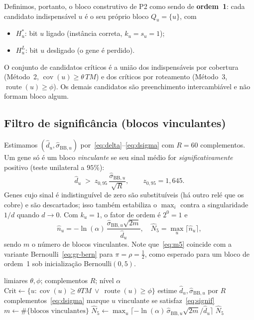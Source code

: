 \documentclass[conference]{IEEEtran}
\newcommand{\Nhat}{\hat{N}}
\newcommand{\cov}{\operatorname{cov}}
\newcommand{\route}{\operatorname{route}}
\begin{document}
Definimos, portanto, o bloco construtivo de P2 como sendo de \textbf{ordem~1}:
cada candidato indispensável $u$ é o seu próprio bloco $Q_u=\{u\}$, com
\begin{itemize}
\item $H_u^*$: bit $u$ ligado (instância correta, $k_u=s_u=1$);
\item $H_u^L$: bit $u$ desligado (o gene é perdido).
\end{itemize}
O conjunto de candidatos críticos é a união dos indispensáveis por cobertura
(Método~2, $\cov(u)\ge\theta\,TM$) e dos críticos por roteamento (Método~3,
$\route(u)\ge\phi$). Os demais candidatos são preenchimento intercambiável e não
formam bloco algum.

\subsection{Filtro de significância (blocos vinculantes)}
Estimamos $(\widehat{d}_u,\widehat{\sigma}_{\mathrm{BB},u})$ por~\eqref{eq:delta}--\eqref{eq:dsigma}
com $R=60$ complementos. Um gene só é um bloco \emph{vinculante} se seu sinal médio
for \emph{significativamente} positivo (teste unilateral a $95\%$):
\begin{equation}
\widehat{d}_u \;>\; z_{0{,}95}\,\frac{\widehat{\sigma}_{\mathrm{BB},u}}{\sqrt{R}},
\qquad z_{0{,}95}=1{,}645.
\label{eq:signif}
\end{equation}
Genes cujo sinal é indistinguível de zero são substituíveis (há outro relé que os
cobre) e são descartados; isso também estabiliza o $\max_i$ contra a singularidade
$1/d$ quando $d\to 0$. Com $k_u=1$, o fator de ordem é $2^{0}=1$ e
\begin{equation}
\boxed{\;\widehat{n}_u = -\ln(\alpha)\,\frac{\widehat{\sigma}_{\mathrm{BB},u}\sqrt{2m}}{\widehat{d}_u},
\quad \Nhat_5=\max_u\lceil \widehat{n}_u\rceil,\;}
\label{eq:m5}
\end{equation}
sendo $m$ o número de blocos vinculantes. Note que~\eqref{eq:m5} coincide com a
variante Bernoulli~\eqref{eq:gr-bern} para $\pi=\rho=\tfrac12$, como esperado para
um bloco de ordem~1 sob inicialização Bernoulli$(0{,}5)$.

\begin{algorithm}[!t]
\caption{Estimativa do Método 5}
\label{alg:m5}
\begin{algorithmic}[1]
\Require limiares $\theta,\phi$; complementos $R$; nível $\alpha$
\State $\mathrm{Crit}\gets\{u:\cov(u)\ge\theta TM \ \vee\ \route(u)\ge\phi\}$
  \State estime $\widehat d_u,\widehat{\sigma}_{\mathrm{BB},u}$ por $R$ complementos~\eqref{eq:dsigma}
  \State marque $u$ vinculante se satisfaz~\eqref{eq:signif}
\EndFor
\State $m\gets\#\{\text{blocos vinculantes}\}$
\State $\Nhat_5\gets\max_u\lceil -\ln(\alpha)\,\widehat{\sigma}_{\mathrm{BB},u}\sqrt{2m}/\widehat d_u\rceil$
\State \Return $\Nhat_5$
\end{algorithmic}
\end{algorithm}
\end{document}

